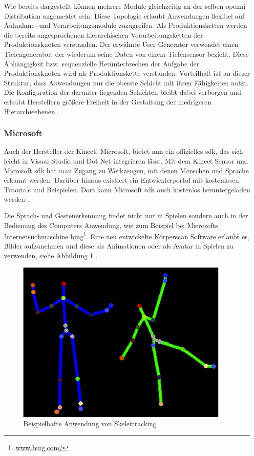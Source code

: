Wie bereits dargestellt können mehrere Module gleichzeitig an der selben \gls{openni} Distribution angemeldet sein.
 Diese Topologie erlaubt Anwendungen flexibel auf Aufnahme- und Verarbeitungsmodule zuzugreifen.
 Als Produktionsketten werden die bereits angesprochenen hierarchischen Verarbeitungsketten der Produktionsknoten verstanden.
 Der erwähnte User Generator verwendet einen Tiefengenerator, der wiederum seine Daten von einem Tiefensensor bezieht.
 Diese Abhängigkeit bzw. sequenzielle Herunterbrechen der Aufgabe der Produktionsknoten wird als Produktionskette verstanden.
 Vorteilhaft ist an dieser Struktur, dass Anwendungen nur die oberste Schicht mit ihren Fähigkeiten nutzt.
 Die Konfiguration der darunter liegenden Schichten bleibt dabei verborgen und erlaubt Herstellern größere Freiheit
 in der Gestaltung der niedrigeren Hierarchieebenen \citep{openNI2012}.

\subsubsection{Microsoft }

Auch der Hersteller der Kinect, Microsoft, bietet nun ein offizielles \gls{sdk},
 das sich leicht in Visual Studio und Dot Net integrieren lässt. Mit dem Kinect Sensor und Microsoft \gls{sdk}
 hat man Zugang zu Werkzeugen, mit denen Menschen und Sprache erkannt werden.
 Darüber hinaus existiert ein Entwicklerportal mit kostenlosen Tutorials und Beispielen.
 Dort kann Microsoft \gls{sdk} auch kostenlos heruntergeladen werden \citep{kinectDevKfW2012}.

Die Sprach- und Gestenerkennung findet nicht nur in Spielen sondern auch in der Bedienung des Computers Anwendung,
 wie zum Beispiel bei Microsofts Internetsuchmaschine bing\footnote{\url{www.bing.com/}}. Eine neu entwickelte Körperscan Software erlaubt es,
 Bilder aufzunehmen und diese als Animationen oder als Avatar in Spielen zu
 verwenden, siehe Abbildung \ref{fig:skelettracking} \citep{noGameKinect2012}.

\begin{figure}[h]
\center
\includegraphics[scale=0.8]{graphics/skelettracking.jpg}
\caption{\label{fig:skelettracking} Beispielhafte Anwendung von Skelettracking
\citep{noGameKinect2012}}
\end{figure}
